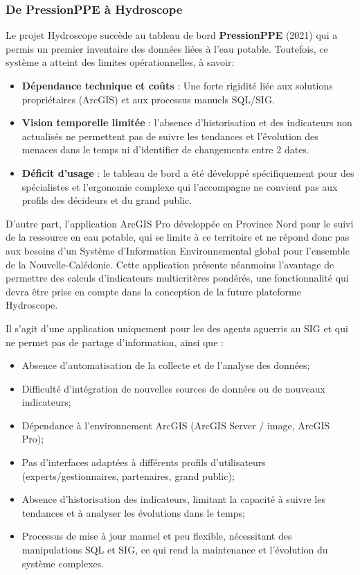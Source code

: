 \documentclass[
  11pt,
]{article}
\providecommand{\tightlist}{%
  \setlength{\itemsep}{0pt}\setlength{\parskip}{0pt}}\usepackage{longtable,booktabs,array}
\begin{document}
\subsubsection{De PressionPPE à
Hydroscope}\label{de-pressionppe-uxe0-hydroscope}

Le projet Hydroscope succède au tableau de bord \textbf{PressionPPE}
(2021) qui a permis un premier inventaire des données liées à l'eau
potable. Toutefois, ce système a atteint des limites opérationnelles, à
savoir:

\begin{itemize}
\tightlist
\item
  \textbf{Dépendance technique et coûts} : Une forte rigidité liée aux
  solutions propriétaires (ArcGIS) et aux processus manuels SQL/SIG.
\item
  \textbf{Vision temporelle limitée} : l'absence d'historisation et des
  indicateurs non actualisés ne permettent pas de suivre les tendances
  et l'évolution des menaces dans le temps ni d'identifier de
  changements entre 2 dates.
\item
  \textbf{Déficit d'usage} : le tableau de bord a été développé
  spécifiquement pour des spécialistes et l'ergonomie complexe qui
  l'accompagne ne convient pas aux profils des décideurs et du grand
  public.
\end{itemize}

D'autre part, l'application ArcGIS Pro développée en Province Nord pour
le suivi de la ressource en eau potable, qui se limite à ce territoire
et ne répond donc pas aux besoins d'un Système d'Information
Environnemental global pour l'ensemble de la Nouvelle-Calédonie. Cette
application présente néanmoins l'avantage de permettre des calculs
d'indicateurs multicritères pondérés, une fonctionnalité qui devra être
prise en compte dans la conception de la future plateforme Hydroscope.

Il s'agit d'une application uniquement pour les des agents aguerris au
SIG et qui ne permet pas de partage d'information, ainsi que :

\begin{itemize}
\tightlist
\item
  Absence d'automatisation de la collecte et de l'analyse des données;
\item
  Difficulté d'intégration de nouvelles sources de données ou de
  nouveaux indicateurs;
\item
  Dépendance à l'environnement ArcGIS (ArcGIS Server / image, ArcGIS
  Pro);
\item
  Pas d'interfaces adaptées à différents profils d'utilisateurs
  (experts/gestionnaires, partenaires, grand public);
\item
  Absence d'historisation des indicateurs, limitant la capacité à suivre
  les tendances et à analyser les évolutions dans le temps;
\item
  Processus de mise à jour manuel et peu flexible, nécessitant des
  manipulations SQL et SIG, ce qui rend la maintenance et l'évolution du
  système complexes.
\end{itemize}
\end{document}
